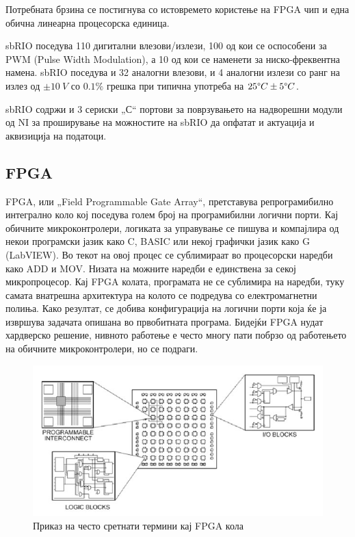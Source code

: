 \documentclass[12pt]{article}
\begin{document}
	Потребната брзина се постигнува со истовремето користење на FPGA чип и една обична линеарна процесорска единица.

	sbRIO поседува 110 дигитални влезови/излези, 100 од кои се оспособени за PWM (Pulse Width Modulation), а 10 од кои се наменети за ниско-фреквентна намена. sbRIO поседува и 32 аналогни влезови, и 4 аналогни излези со ранг на излез од $ \pm 10\ V$ со $0.1\%$ грешка при типична употреба на $25\degree C \pm5\degree C$.

	sbRIO содржи и 3 сериски „С“ портови за поврзувањето на надворешни модули од NI за проширување на можностите на sbRIO да опфатат и актуација и аквизиција на податоци.

	\subsection{FPGA}
		FPGA, или „Field Programmable Gate Array“, претставува репрограмибилно интегрално коло кој поседува голем број на програмибилни логични порти. Кај обичните микроконтролери, логиката за управување се пишува и компајлира од некои програмски јазик како C, BASIC или некој графички јазик како G (LabVIEW). Во текот на овој процес се сублимираат во процесорски наредби како ADD и MOV. Низата на можните наредби е единствена за секој микропроцесор. Кај FPGA колата, програмата не се сублимира на наредби, туку самата внатрешна архитектура на колото се подредува со електромагнетни полиња. Како резултат, се добива конфигурација на логични порти која ќе ја извршува задачата опишана во првобитната програма. Бидејќи FPGA нудат хардверско решение, нивното работење е често многу пати побрзо од работењето на обичните микроконтролери, но се подраги.

		\begin{figure}[h]
			\includegraphics[width=0.75\linewidth]{./images/fpga_diagram.jpg}
			\centering
			\caption{Приказ на често сретнати термини кај FPGA кола}
			\label{fig:fpga_diagram_jpg}
			\end{figure}
\end{document}
